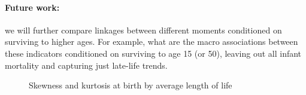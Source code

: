 \documentclass{article}
\begin{document}
\paragraph{Future work:} we will further compare linkages between different
moments conditioned on surviving to higher ages. For example, what are the macro
associations between these indicators conditioned on surviving to age 15 (or
50), leaving out all infant mortality and capturing just late-life trends.

\begin{figure}
\caption{Skewness and kurtosis at birth by average length of life}
\label{fig:sk&kt}
\end{figure}

\FloatBarrier
\singlespacing

   
\end{document}
